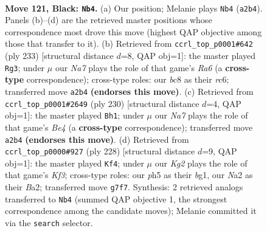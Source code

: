 \documentclass[11pt]{article}
\begin{document}
\clearpage

\begin{figure}[p]\centering
\begin{subfigure}{0.46\textwidth}\centering
\resizebox{\linewidth}{!}{%
\newchessgame
\chessboard[
  setfen={2B5/6k1/8/6PP/8/8/n5K1/8 b - - 12 121},
  showmover=false,
  pgfstyle=straightmove, color=movearrow, markmove={a2-b4}
]}
\caption{}
\end{subfigure}\hfill
\begin{subfigure}{0.46\textwidth}\centering
\resizebox{\linewidth}{!}{%
\newchessgame
\chessboard[
  setfen={8/6k1/2R5/5PP1/7p/r7/5K2/8 b - - 0 117},
  showmover=false,
  pgfstyle=straightmove, color=movearrow, markmove={a3-g3}
]}
\caption{}
\end{subfigure}
\\[4pt]
\begin{subfigure}{0.46\textwidth}\centering
\resizebox{\linewidth}{!}{%
\newchessgame
\chessboard[
  setfen={8/8/8/1k6/3bB3/6pp/8/5K2 w - - 72 116},
  showmover=false,
  pgfstyle=straightmove, color=movearrow, markmove={e4-h1}
]}
\caption{}
\end{subfigure}\hfill
\begin{subfigure}{0.46\textwidth}\centering
\resizebox{\linewidth}{!}{%
\newchessgame
\chessboard[
  setfen={8/4k3/8/4Pp2/8/5K2/B7/6b1 w - - 3 115},
  showmover=false,
  pgfstyle=straightmove, color=movearrow, markmove={f3-f4}
]}
\caption{}
\end{subfigure}
\caption{\textbf{Move 121, Black: \texttt{Nb4}.} (a) Our position; Melanie plays \texttt{Nb4} (\texttt{a2b4}). Panels (b)--(d) are the retrieved master positions whose correspondence most drove this move (highest QAP objective among those that transfer to it). (b) Retrieved from \texttt{ccrl\_top\_p0001\#642} (ply 233) [structural distance $d$=8, QAP obj=1]: the master played \texttt{Rg3}; under $\mu$ our \emph{Na7} plays the role of that game's \emph{Ra6} (a \textbf{cross-type} correspondence); cross-type roles: our \emph{b}c8 as their \emph{r}c6; transferred move \texttt{a2b4} \textbf{(endorses this move)}. (c) Retrieved from \texttt{ccrl\_top\_p0001\#2649} (ply 230) [structural distance $d$=4, QAP obj=1]: the master played \texttt{Bh1}; under $\mu$ our \emph{Na7} plays the role of that game's \emph{Be4} (a \textbf{cross-type} correspondence); transferred move \texttt{a2b4} \textbf{(endorses this move)}. (d) Retrieved from \texttt{ccrl\_top\_p0000\#927} (ply 228) [structural distance $d$=9, QAP obj=1]: the master played \texttt{Kf4}; under $\mu$ our \emph{Kg2} plays the role of that game's \emph{Kf3}; cross-type roles: our \emph{p}h5 as their \emph{b}g1, our \emph{N}a2 as their \emph{B}a2; transferred move \texttt{g7f7}. Synthesis: 2 retrieved analogs transferred to \texttt{Nb4} (summed QAP objective 1, the strongest correspondence among the candidate moves); Melanie committed it via the \texttt{search} selector.}
\label{fig:thought-m241}
\end{figure}
\end{document}
